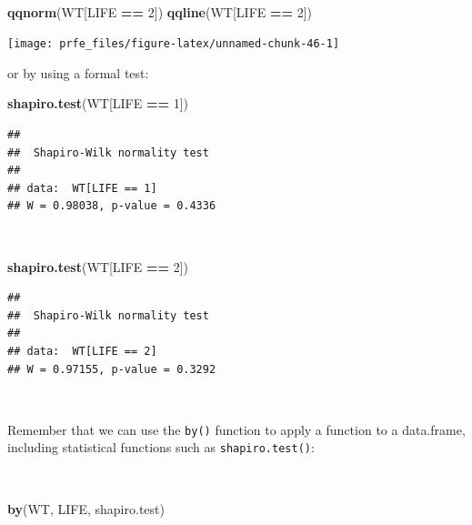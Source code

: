 \documentclass[12pt,a4paper]{book}
\newenvironment{Shaded}{\begin{snugshade}}{\end{snugshade}}
\newcommand{\KeywordTok}[1]{\textcolor[rgb]{0.13,0.29,0.53}{\textbf{#1}}}
\newcommand{\DecValTok}[1]{\textcolor[rgb]{0.00,0.00,0.81}{#1}}
\newcommand{\StringTok}[1]{\textcolor[rgb]{0.31,0.60,0.02}{#1}}
\newcommand{\OperatorTok}[1]{\textcolor[rgb]{0.81,0.36,0.00}{\textbf{#1}}}
\newcommand{\NormalTok}[1]{#1}
\theoremstyle{definition}
\theoremstyle{definition}
\theoremstyle{definition}
\theoremstyle{remark}
\begin{document}
~

\begin{Shaded}
\begin{Highlighting}[]
\KeywordTok{qqnorm}\NormalTok{(WT[LIFE }\OperatorTok{==}\StringTok{ }\DecValTok{2}\NormalTok{])}
\KeywordTok{qqline}\NormalTok{(WT[LIFE }\OperatorTok{==}\StringTok{ }\DecValTok{2}\NormalTok{])}
\end{Highlighting}
\end{Shaded}

\begin{center}\texttt{[image: prfe\_files/figure-latex/unnamed-chunk-46-1]} \end{center}

\newpage

or by using a formal test:

\begin{Shaded}
\begin{Highlighting}[]
\KeywordTok{shapiro.test}\NormalTok{(WT[LIFE }\OperatorTok{==}\StringTok{ }\DecValTok{1}\NormalTok{])}
\end{Highlighting}
\end{Shaded}

\begin{verbatim}
## 
##  Shapiro-Wilk normality test
## 
## data:  WT[LIFE == 1]
## W = 0.98038, p-value = 0.4336
\end{verbatim}

~

\begin{Shaded}
\begin{Highlighting}[]
\KeywordTok{shapiro.test}\NormalTok{(WT[LIFE }\OperatorTok{==}\StringTok{ }\DecValTok{2}\NormalTok{])}
\end{Highlighting}
\end{Shaded}

\begin{verbatim}
## 
##  Shapiro-Wilk normality test
## 
## data:  WT[LIFE == 2]
## W = 0.97155, p-value = 0.3292
\end{verbatim}

~

Remember that we can use the \texttt{by()} function to apply a function
to a data.frame, including statistical functions such as
\texttt{shapiro.test()}:

~

\begin{Shaded}
\begin{Highlighting}[]
\KeywordTok{by}\NormalTok{(WT, LIFE, shapiro.test)}
\end{Highlighting}
\end{Shaded}
\end{document}
